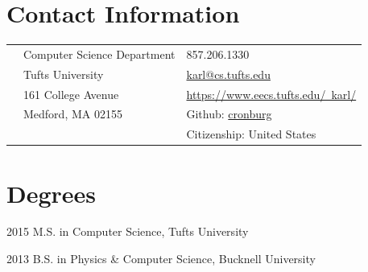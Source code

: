 \documentclass[margin,line]{res}                          %
\newenvironment{list1}{
  \begin{list}{\ding{113}}{%
      \setlength{\itemsep}{0in}
      \setlength{\parsep}{0in} \setlength{\parskip}{0in}
      \setlength{\topsep}{0in} \setlength{\partopsep}{0in}
      \setlength{\leftmargin}{0.17in}}}{\end{list}}
\begin{document}

\begin{resume}
\thispagestyle{plain} %

\section{\sc Contact Information}
\vspace{.05in}
\begin{tabular}{@{}p{0.20in}p{2.75in}p{2.75in}}
 & Computer Science Department  & 857.206.1330 \\
 & Tufts University             & \href{mailto:karl@cs.tufts.edu}{karl@cs.tufts.edu} \\
 & 161 College Avenue           & \href{https://www.eecs.tufts.edu/~karl/}{https://www.eecs.tufts.edu/~karl/}\\
 & Medford, MA 02155            & Github: \href{https://github.com/cronburg/}{cronburg} \\
 &                              & Citizenship: United States \\
\end{tabular}



\section{\sc Degrees}
\begin{list1}
\item[] 2015 \hspace{0.25cm} M.S. in Computer Science, Tufts University
\item[] 2013 \hspace{0.25cm} B.S. in Physics \& Computer Science, Bucknell University
\end{list1}


\end{resume}
\end{document}
